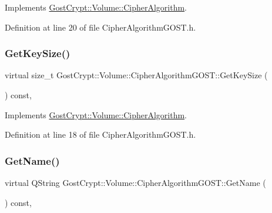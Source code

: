 Implements \hyperlink{class_gost_crypt_1_1_volume_1_1_cipher_algorithm_a01b18f6950161fa518115bf08db3a997}{Gost\+Crypt\+::\+Volume\+::\+Cipher\+Algorithm}.



Definition at line 20 of file Cipher\+Algorithm\+G\+O\+S\+T.\+h.

\mbox{\label{class_gost_crypt_1_1_volume_1_1_cipher_algorithm_g_o_s_t_aad89411cf81e7e506b2fbd86f433aeb4}} 
\subsubsection{\texorpdfstring{Get\+Key\+Size()}{GetKeySize()}}
{\footnotesize\ttfamily virtual size\+\_\+t Gost\+Crypt\+::\+Volume\+::\+Cipher\+Algorithm\+G\+O\+S\+T\+::\+Get\+Key\+Size (\begin{DoxyParamCaption}{ }\end{DoxyParamCaption}) const\hspace{0.3cm}{\ttfamily [inline]}, {\ttfamily [virtual]}}



Implements \hyperlink{class_gost_crypt_1_1_volume_1_1_cipher_algorithm_aaf60dff95401e6f017ce0c2584f0e593}{Gost\+Crypt\+::\+Volume\+::\+Cipher\+Algorithm}.



Definition at line 18 of file Cipher\+Algorithm\+G\+O\+S\+T.\+h.

\mbox{\label{class_gost_crypt_1_1_volume_1_1_cipher_algorithm_g_o_s_t_a23b0c16c11ee4d10ce2a80bfd64c6fd7}} 
\subsubsection{\texorpdfstring{Get\+Name()}{GetName()}}
{\footnotesize\ttfamily virtual Q\+String Gost\+Crypt\+::\+Volume\+::\+Cipher\+Algorithm\+G\+O\+S\+T\+::\+Get\+Name (\begin{DoxyParamCaption}{ }\end{DoxyParamCaption}) const\hspace{0.3cm}{\ttfamily [inline]}, {\ttfamily [virtual]}}



